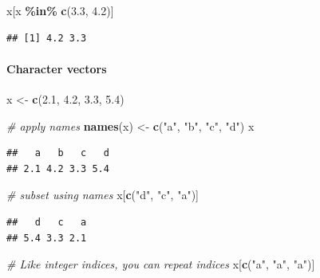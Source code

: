 \documentclass[
]{book}
\newenvironment{Shaded}{\begin{snugshade}}{\end{snugshade}}
\newcommand{\CommentTok}[1]{\textcolor[rgb]{0.56,0.35,0.01}{\textit{#1}}}
\newcommand{\FloatTok}[1]{\textcolor[rgb]{0.00,0.00,0.81}{#1}}
\newcommand{\FunctionTok}[1]{\textcolor[rgb]{0.13,0.29,0.53}{\textbf{#1}}}
\newcommand{\NormalTok}[1]{#1}
\newcommand{\OtherTok}[1]{\textcolor[rgb]{0.56,0.35,0.01}{#1}}
\newcommand{\SpecialCharTok}[1]{\textcolor[rgb]{0.81,0.36,0.00}{\textbf{#1}}}
\newcommand{\StringTok}[1]{\textcolor[rgb]{0.31,0.60,0.02}{#1}}
\begin{document}
\begin{Shaded}
\begin{Highlighting}[]
\NormalTok{x[x }\SpecialCharTok{\%in\%} \FunctionTok{c}\NormalTok{(}\FloatTok{3.3}\NormalTok{, }\FloatTok{4.2}\NormalTok{)]}
\end{Highlighting}
\end{Shaded}

\begin{verbatim}
## [1] 4.2 3.3
\end{verbatim}

\paragraph{Character vectors}\label{character-vectors}

\begin{Shaded}
\begin{Highlighting}[]
\NormalTok{x }\OtherTok{\textless{}{-}} \FunctionTok{c}\NormalTok{(}\FloatTok{2.1}\NormalTok{, }\FloatTok{4.2}\NormalTok{, }\FloatTok{3.3}\NormalTok{, }\FloatTok{5.4}\NormalTok{)}

\CommentTok{\# apply names}
\FunctionTok{names}\NormalTok{(x) }\OtherTok{\textless{}{-}} \FunctionTok{c}\NormalTok{(}\StringTok{"a"}\NormalTok{, }\StringTok{"b"}\NormalTok{, }\StringTok{"c"}\NormalTok{, }\StringTok{"d"}\NormalTok{)}
\NormalTok{x}
\end{Highlighting}
\end{Shaded}

\begin{verbatim}
##   a   b   c   d 
## 2.1 4.2 3.3 5.4
\end{verbatim}

\begin{Shaded}
\begin{Highlighting}[]
\CommentTok{\# subset using names}
\NormalTok{x[}\FunctionTok{c}\NormalTok{(}\StringTok{"d"}\NormalTok{, }\StringTok{"c"}\NormalTok{, }\StringTok{"a"}\NormalTok{)]}
\end{Highlighting}
\end{Shaded}

\begin{verbatim}
##   d   c   a 
## 5.4 3.3 2.1
\end{verbatim}

\begin{Shaded}
\begin{Highlighting}[]
\CommentTok{\# Like integer indices, you can repeat indices}
\NormalTok{x[}\FunctionTok{c}\NormalTok{(}\StringTok{"a"}\NormalTok{, }\StringTok{"a"}\NormalTok{, }\StringTok{"a"}\NormalTok{)]}
\end{Highlighting}
\end{Shaded}
\end{document}
